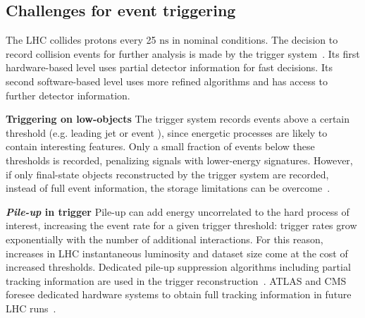 

\begin{textbox}[!h]
\section{Challenges for event triggering}

The LHC collides protons every 25 $\mathrm{ns}$ in nominal conditions. %
The decision to record collision events for further analysis is made by the trigger system~\cite{Smith:2016vcs,Aaboud:2016leb,Khachatryan:2016bia}. 
Its first hardware-based level uses partial detector information for fast decisions.%
Its second software-based level uses more refined algorithms and has access to further detector information.%

\textbf{Triggering on low-\pt objects}
The trigger system records events above a certain threshold (e.g. leading jet \pt or event \MET), since energetic processes are likely to contain interesting features. 
Only a small fraction of events below these thresholds is recorded, penalizing signals with lower-energy signatures. 
However, if only final-state objects reconstructed by the trigger system are recorded, instead of full event information, the storage limitations can be overcome~\cite{Aaij:2016rxn,CMS-PAS-EXO-16-056,Aaboud:2016leb}. 

\textbf{\textit{Pile-up} in trigger} 
Pile-up can add energy uncorrelated to the hard process of interest, increasing the event rate for a given trigger threshold: trigger \MET rates grow exponentially with the number of additional interactions. 
For this reason, increases in LHC instantaneous luminosity and dataset size come at the cost of increased thresholds.%
Dedicated pile-up suppression algorithms including partial tracking information are used in the trigger reconstruction~\cite{CMS:2014ata,ATLAS-CONF-2014-019}. ATLAS and CMS foresee dedicated hardware systems to obtain full tracking information in future LHC runs~\cite{Shochet:2013gaw,1748-0221-6-12-C12065}. 
 
\end{textbox}
